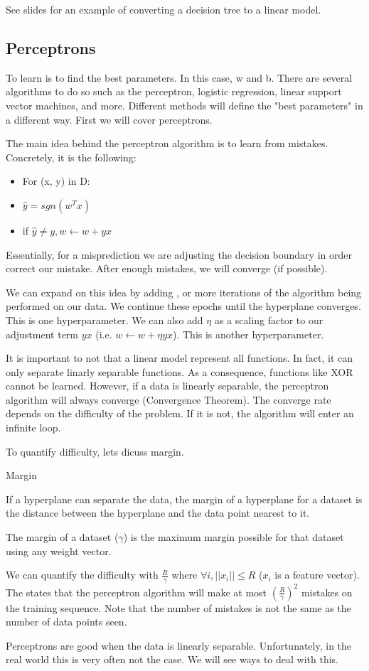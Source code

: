 See slides for an example of converting a decision tree to a linear model.

\subsection*{Perceptrons}
To learn is to find the best parameters. In this case, w and b. There are several algorithms to do so such as the perceptron, logistic regression, linear support vector machines, and more. Different methods will define the "best parameters" in a different way. First we will cover perceptrons. 

The main idea behind the perceptron algorithm is to learn from mistakes. Concretely, it is the following:
\begin{itemize}
    \item For (x, y) in D:
    \item $\hat{y} = sgn(w^Tx)$
    \item if $\hat{y} \neq y, w \leftarrow w + yx$
\end{itemize}

Essentially, for a misprediction we are adjusting the decision boundary in order correct our mistake. After enough mistakes, we will converge (if possible).

We can expand on this idea by adding , or more iterations of the algorithm being performed on our data. We continue these epochs until the hyperplane converges. This is one hyperparameter. We can also add $\eta$ as a scaling factor to our adjustment term $yx$ (i.e. $w \leftarrow w + \eta yx$). This is another hyperparameter.

It is important to not that a linear model  represent all functions. In fact, it can only separate linarly separable functions. As a consequence, functions like XOR cannot be learned. However, if a data is linearly separable, the perceptron algorithm will always converge (Convergence Theorem). The converge rate depends on the difficulty of the problem. If it is not, the algorithm will enter an infinite loop.

To quantify difficulty, lets dicuss margin.

\begin{definition}
    Margin

    If a hyperplane can separate the data, the margin of a hyperplane for a dataset is the distance between the hyperplane and the data point nearest to it.

    The margin of a dataset ($\gamma$) is the maximum margin possible for that dataset using any weight vector.
\end{definition}

We can quantify the difficulty with $\frac{R}{\gamma}$ where $\forall i,  ||x_i|| \le R $ ($x_i$ is a feature vector). The  states that the perceptron algorithm will make at most $(\frac{R}{\gamma})^2$ mistakes on the training sequence. Note that the number of mistakes is not the same as the number of data points seen. 

Perceptrons are good when the data is linearly separable. Unfortunately, in the real world this is very often not the case. We will see ways to deal with this.

